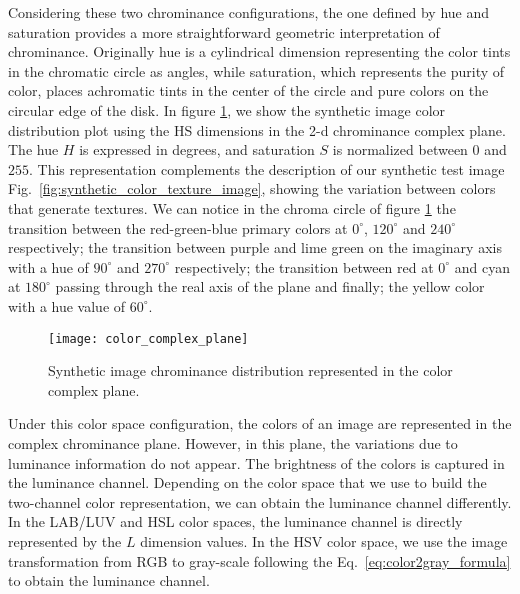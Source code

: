 Considering these two chrominance configurations, the one defined by hue and saturation provides a more straightforward geometric interpretation of chrominance. Originally hue is a cylindrical dimension representing the color tints in the chromatic circle as angles, while saturation, which represents the purity of color, places achromatic tints in the center of the circle and pure colors on the circular edge of the disk. In figure \ref{fig:color_complex_plane}, we show the synthetic image color distribution plot using the HS dimensions in the 2-d chrominance complex plane. The hue $H$ is expressed in degrees, and saturation $S$ is normalized between $0$ and $255$. This representation complements the description of our synthetic test image Fig.\ \ref{fig:synthetic_color_texture_image}, showing the variation between colors that generate textures. We can notice in the chroma circle of figure \ref{fig:color_complex_plane} the transition between the red-green-blue primary colors at $0^\circ$, $120^\circ$ and $240^\circ$ respectively; the transition between purple and lime green on the imaginary axis with a hue of $90^\circ$ and $270^\circ$ respectively; the transition between red at $0^\circ$ and cyan at $180^\circ$ passing through the real axis of the plane and finally; the yellow color with a hue value of $60^\circ$.

\begin{figure}[!ht]
	\centering
    \texttt{[image: color\_complex\_plane]}
	\caption{Synthetic image chrominance distribution represented in the color complex plane.}\label{fig:color_complex_plane}
\end{figure}

Under this color space configuration, the colors of an image are represented in the complex chrominance plane. However, in this plane, the variations due to luminance information do not appear. The brightness of the colors is captured in the luminance channel. Depending on the color space that we use to build the two-channel color representation, we can obtain the luminance channel differently. In the LAB/LUV and HSL color spaces, the luminance channel is directly represented by the $L$ dimension values. In the HSV color space, we use the image transformation from RGB to gray-scale following the Eq.\ \eqref{eq:color2gray_formula} to obtain the luminance channel.

